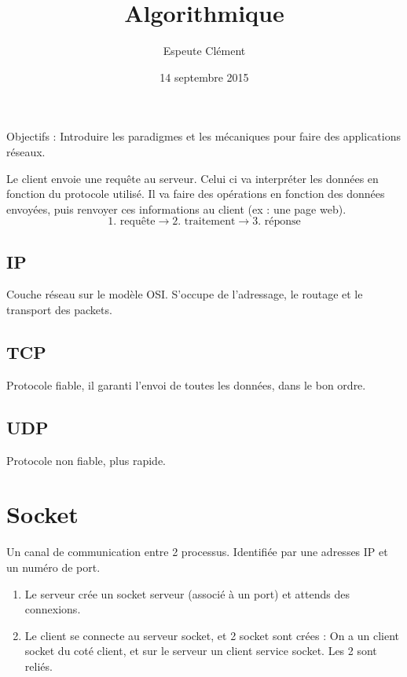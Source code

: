 \documentclass[11pt]{article}
\title{Algorithmique}
\author{{\sc Espeute} Clément}
\date{14 septembre 2015}
\begin{document}
\pagestyle{fancy}
\maketitle
\newpage
Objectifs : Introduire les paradigmes et les mécaniques pour faire des applications réseaux.

Le client envoie une requête au serveur. Celui ci va interpréter les données en fonction du protocole utilisé. Il va faire des opérations en fonction des données envoyées, puis renvoyer ces informations au client (ex : une page web).
$$1.\text{ requête} \to 2.\text{ traitement} \to 3.\text{ réponse}$$

\subsection{IP}
Couche réseau sur le modèle OSI.
S'occupe de l'adressage, le routage et le transport des packets.
\subsection{TCP}
Protocole fiable, il garanti l'envoi de toutes les données, dans le bon ordre.
\subsection{UDP}
Protocole non fiable, plus rapide.

\section{Socket}
Un canal de communication entre 2 processus. Identifiée par une adresses IP et un numéro de port.

\begin{enumerate}
	\item Le serveur crée un socket serveur (associé à un port) et attends des connexions. 
	\item Le client se connecte au serveur socket, et 2 socket sont crées : On a un client socket du coté client, et sur le serveur un client service socket. Les 2 sont reliés.
\end{enumerate}
\end{document}
